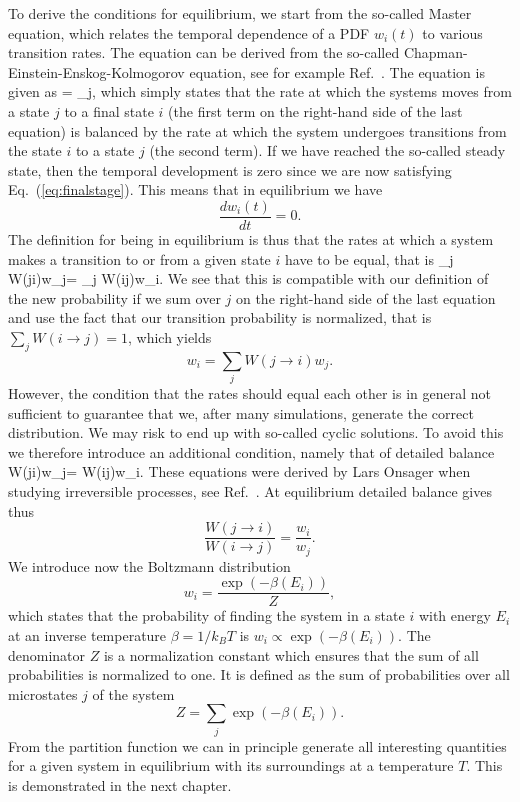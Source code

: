 To derive the conditions for equilibrium, we start from the so-called Master equation, which relates the temporal dependence of a PDF $w_i(t)$ to various transition rates. The equation can be derived from the so-called 
Chapman-Einstein-Enskog-Kolmogorov equation, see for example Ref.~\cite{cd2001}. The equation is given as 
\be
\label{eq:masterequation}
 = \sum_j,
\ee 
which simply states that the rate at which the systems moves from a state $j$
to a final state $i$ (the first term on the right-hand side of the last equation) is balanced by the rate at which the system undergoes transitions from the state $i$ to a state $j$ (the second term). If we have reached the so-called steady state, then the temporal development is zero since we are now satisfying
Eq.~(\ref{eq:finalstage}). This  means that in equilibrium we have
\[
\frac{d w_i(t)}{dt} = 0.
\]
The definition for being in equilibrium is thus that the rates at which a system makes 
a transition to or from a given state $i$ have to be equal, that is
       \be \sum_j W(j\rightarrow i)w_j= \sum_j W(i\rightarrow j)w_i.  \ee
We see that this is compatible with our definition of the new probability if we sum
over $j$ on the right-hand side of the last equation and use the fact that our
transition probability is normalized, that is $\sum_j W(i\rightarrow j) = 1$, which yields
       \[ w_i=\sum_j W(j\rightarrow i)w_j.  \]
However, the condition that the rates should equal each other is in general not sufficient
to guarantee that we, after many simulations, generate the correct distribution.
We may risk to end up with so-called cyclic solutions. To avoid this
we therefore introduce an additional condition, namely that of detailed balance 
       \be W(j\rightarrow i)w_j= W(i\rightarrow j)w_i.  \ee
These equations were derived by Lars Onsager when studying irreversible processes, see Ref.~\cite{onsager1931}.
At equilibrium detailed balance gives thus
       \[ \frac{W(j\rightarrow i)}{W(i\rightarrow j)}=\frac{w_i}{w_j}.  \]
We introduce  now the Boltzmann distribution 
\[
   w_i= \frac{\exp{(-\beta(E_i))}}{Z},
\]
which states that the probability of finding the system in a state $i$ with energy $E_i$ 
at an inverse temperature $\beta = 1/k_BT$ is $w_i\propto \exp{(-\beta(E_i))}$.
The denominator $Z$ is a normalization constant which ensures that the sum of all
probabilities is normalized to one. It is defined as the sum of probabilities over all microstates
$j$ of the system
\[
   Z=\sum_j \exp{(-\beta(E_i))}.
\]
From the partition function we can in principle generate all interesting quantities
for a given system in equilibrium with its surroundings at a temperature $T$. This is
demonstrated in the next chapter.


